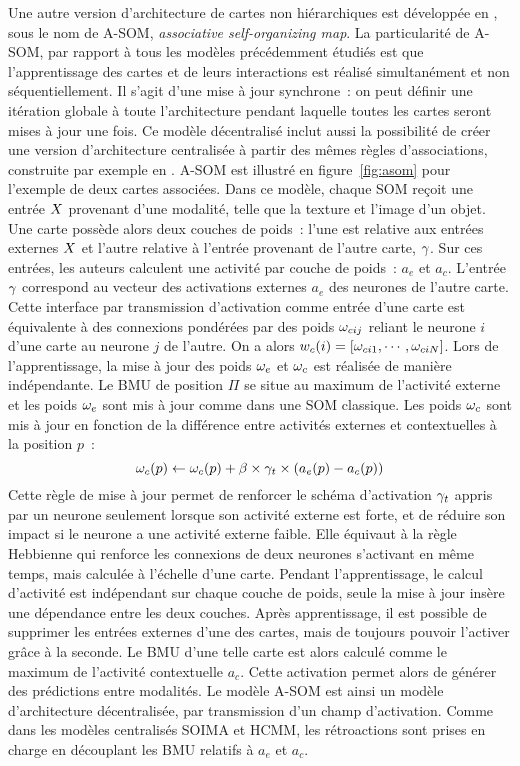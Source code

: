 \documentclass[../main]{subfiles}
\begin{document}
Une autre version d'architecture de cartes non hiérarchiques est développée en \cite{johnsson_associating_2008,johnsson_associative_2009}, sous le nom de A-SOM, \emph{associative self-organizing map}. 
La particularité de A-SOM, par rapport à tous les modèles précédemment étudiés est que l'apprentissage des cartes et de leurs interactions est réalisé simultanément et non séquentiellement. Il s'agit d'une mise à jour synchrone~: on peut définir une itération globale à toute l'architecture pendant laquelle toutes les cartes seront mises à jour une fois.
Ce modèle décentralisé inclut aussi la possibilité de créer une version d'architecture centralisée à partir des mêmes règles d'associations, construite par exemple en \cite{buonamente_hierarchies_2016}. A-SOM est illustré en figure~\ref{fig:asom} pour l'exemple de deux cartes associées. 
Dans ce modèle, chaque SOM reçoit une entrée $X$ provenant d'une modalité, telle que la texture et l'image d'un objet. Une carte possède alors deux couches de poids~: l'une est relative aux entrées externes $X$ et l'autre relative à l'entrée provenant de l'autre carte, $\gamma$. Sur ces entrées, les auteurs calculent une activité par couche de poids~: $a_e$ et $a_c$.
L'entrée $\gamma$ correspond au vecteur des activations externes $a_e$ des neurones de l'autre carte.
Cette interface par transmission d'activation comme entrée d'une carte est équivalente à des connexions pondérées par des poids $\omega_{cij}$ reliant le neurone $i$ d'une carte au neurone $j$ de l'autre. 
On a alors $w_c(i) = [\omega_{ci1}, \cdots, \omega_{ciN}]$.
Lors de l'apprentissage, la mise à jour des poids $\omega_e$ et $\omega_c$ est réalisée de manière indépendante. 
Le BMU de position $\Pi$ se situe au maximum de l'activité externe et les poids $\omega_e$ sont mis à jour comme dans une SOM classique.
Les poids $\omega_c$ sont mis à jour en fonction de la différence entre activités externes et contextuelles à la position $p$~:
$$ \omega_c(p) \leftarrow \omega_c(p) + \beta \times \gamma_t \times (a_e(p) - a_c(p))$$
Cette règle de mise à jour permet de renforcer le schéma d'activation $\gamma_t$ appris par un neurone seulement lorsque son activité externe est forte, et de réduire son impact si le neurone a une activité externe faible. Elle équivaut à la règle Hebbienne qui renforce les connexions de deux neurones s'activant en même temps, mais calculée à l'échelle d'une carte.
Pendant l'apprentissage, le calcul d'activité est indépendant sur chaque couche de poids, seule la mise à jour insère une dépendance entre les deux couches.
Après apprentissage, il est possible de supprimer les entrées externes d'une des cartes, mais de toujours pouvoir l'activer grâce à la seconde. Le BMU d'une telle carte est alors calculé comme le maximum de l'activité contextuelle $a_c$. Cette activation permet alors de générer des prédictions entre modalités.
Le modèle A-SOM est ainsi un modèle d'architecture décentralisée, par transmission d'un champ d'activation. Comme dans les modèles centralisés SOIMA et HCMM, les rétroactions sont prises en charge en découplant les BMU relatifs à $a_e$ et $a_c$.
\end{document}
